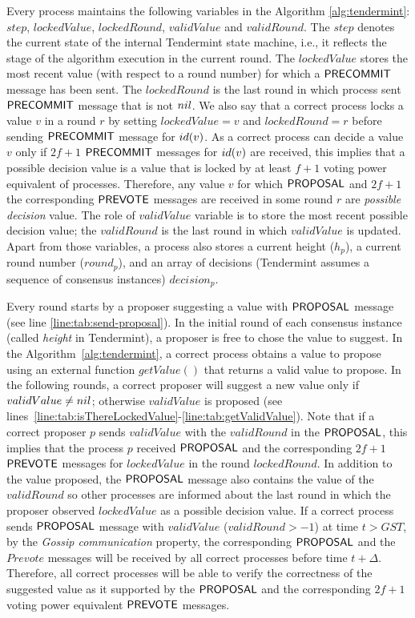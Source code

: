 Every process maintains the following variables in the Algorithm \ref{alg:tendermint}: $step$, $lockedValue$, $lockedRound$, $validValue$ and $validRound$. The $step$ denotes the current state of the internal Tendermint state machine, i.e., it reflects the stage of the algorithm execution in the current round. The $lockedValue$ stores the most recent value (with respect to a round number) for which a $\mathsf{PRECOMMIT}$ message has been sent. The $lockedRound$ is the last round in which process sent $\mathsf{PRECOMMIT}$ message that is not $nil$. We also say that a correct process locks a value $v$ in a round $r$ by setting $lockedValue = v$ and $lockedRound = r$ before sending $\mathsf{PRECOMMIT}$ message for $id(v)$. As a correct process can decide a value $v$ only if $2f+1$ $\mathsf{PRECOMMIT}$ messages for $id(v)$ are received, this implies that a possible decision value is a value that is locked by at least $f+1$ voting power equivalent of processes. Therefore, any value $v$ for which $\mathsf{PROPOSAL}$ and $2f+1$ the corresponding $\mathsf{PREVOTE}$ messages are received in some round $r$ are \emph{possible decision} value. The role of $validValue$ variable is to store the most recent possible decision value; the $validRound$ is the last round in which $validValue$ is updated. Apart from those variables, a process also stores a current height ($h_p$), a current round number ($round_p$), and an array of decisions (Tendermint assumes a sequence of consensus instances) $decision_p$. 

Every round starts by a proposer suggesting a value with $\mathsf{PROPOSAL}$ message (see line \ref{line:tab:send-proposal}). In the initial round of each consensus instance (called \emph{height} in Tendermint), a proposer is free to chose the value to suggest. In the Algorithm~\ref{alg:tendermint}, a correct process obtains a value to propose using an external function    
$getValue()$ that returns a valid value to propose. In the following rounds, a correct proposer will suggest a new value only if $validValue \neq nil$; otherwise $validValue$ is proposed (see lines~\ref{line:tab:isThereLockedValue}-\ref{line:tab:getValidValue}). Note that if a correct proposer $p$ sends $validValue$ with the $validRound$ in the $\mathsf{PROPOSAL}$, this implies that the process $p$ received $\mathsf{PROPOSAL}$ and the corresponding $2f+1$ $\mathsf{PREVOTE}$ messages for $lockedValue$ in the round $lockedRound$. In addition to the value proposed, the $\mathsf{PROPOSAL}$ message also contains the value of the $validRound$ so other processes are informed about the last round in which the proposer observed $lockedValue$ as a possible decision value.  
If a correct process sends $\mathsf{PROPOSAL}$ message with $validValue$ ($validRound > -1$) at time $t > GST$, by the \emph{Gossip communication} property, the corresponding $\mathsf{PROPOSAL}$ and the $Prevote$ messages will be received by all correct processes before time $t+\Delta$. Therefore, all correct processes will be able to verify the correctness of the suggested value as it supported by the $\mathsf{PROPOSAL}$ and the corresponding $2f+1$ voting power equivalent $\mathsf{PREVOTE}$ messages.   

